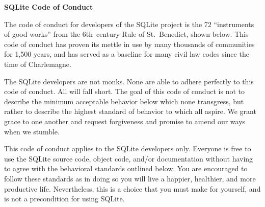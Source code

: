 \def\section#1.{\bigskip{\noindent\bf#1}\par\noindent\ignorespaces}
\newcount\codenum {}
\def\code{\advance\codenum by1\item{\the\codenum.}}

\vglue 1in
\centerline{\bf SQLite Code of Conduct}
\section Overview.
The code of conduct for developers of the SQLite project is the 72
``instruments of good works'' from the 6th~century Rule of
St.~Benedict, shown below. This code of conduct has proven its mettle
in use by many thousands of communities for 1,500 years, and has
served as a baseline for many civil law codes since the time of
Charlemagne.

The SQLite developers are not monks. None are able to adhere perfectly
to this code of conduct. All will fall short. The goal of this code of
conduct is not to describe the minimum acceptable behavior below which
none transgress, but rather to describe the highest standard of
behavior to which all aspire. We grant grace to one another and
request forgiveness and promise to amend our ways when we stumble.

This code of conduct applies to the SQLite developers only. Everyone
is free to use the SQLite source code, object code, and/or
documentation without having to agree with the behavioral standards
outlined below. You are encouraged to follow these standards as in
doing so you will live a happier, healthier, and more productive
life. Nevertheless, this is a choice that you must make for yourself,
and is not a precondition for using SQLite.

